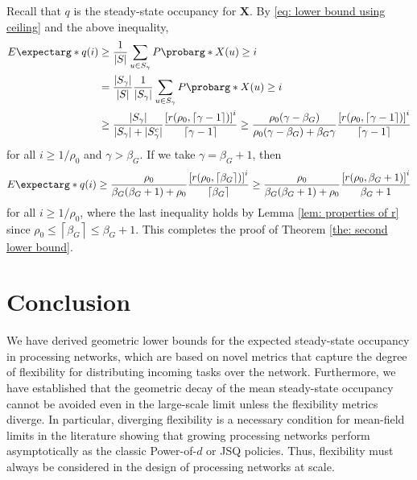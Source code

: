 \documentclass[a4paper, 12pt]{article}
\theoremstyle{definition}
\newcommand{\ceil}[1]{\left\lceil#1\right\rceil}
\newcommand{\bX}{\boldsymbol{X}}
\newcommand{\expect}{E\expectarg}
\newcommand{\cprob}{P\probarg}
\begin{document}
Recall that $q$ is the steady-state occupancy for $\bX$. By \eqref{eq: lower bound using ceiling} and the above inequality,
\begin{align*}
	\expect*{q(i)} &\geq \frac{1}{|S|}\sum_{u \in S_\gamma} \cprob*{X(u) \geq i} \\
	&= \frac{|S_\gamma|}{|S|}\frac{1}{|S_\gamma|}\sum_{u \in S_\gamma} \cprob*{X(u) \geq i} \\
	&\geq \frac{|S_\gamma|}{|S_\gamma| + |S_\gamma^c|}\frac{\left[r(\rho_0, \ceil{\gamma - 1})\right]^i}{\ceil{\gamma - 1}} \geq \frac{\rho_0(\gamma - \beta_G)}{\rho_0(\gamma - \beta_G) + \beta_G\gamma}\frac{\left[r(\rho_0, \ceil{\gamma - 1})\right]^i}{\ceil{\gamma - 1}}
\end{align*}
for all $i \geq 1 / \rho_0$ and $\gamma > \beta_G$. If we take $\gamma = \beta_G + 1$, then
\begin{equation*}
	\expect*{q(i)} \geq \frac{\rho_0}{\beta_G (\beta_G + 1) + \rho_0}\frac{\left[r(\rho_0, \ceil{\beta_G})\right]^i}{\ceil{\beta_G}} \geq \frac{\rho_0}{\beta_G (\beta_G + 1) + \rho_0}\frac{\left[r(\rho_0, \beta_G + 1)\right]^i}{\beta_G + 1}
\end{equation*}
for all $i \geq  1 / \rho_0$, where the last inequality holds by Lemma \ref{lem: properties of r} since $\rho_0 \leq \ceil{\beta_G} \leq \beta_G + 1$. This completes the proof of Theorem \ref{the: second lower bound}.

\section{Conclusion}
\label{sec: conclusion}

We have derived geometric lower bounds for the expected steady-state occupancy in processing networks, which are based on novel metrics that capture the degree of flexibility for distributing incoming tasks over the network. Furthermore, we have established that the geometric decay of the mean steady-state occupancy cannot be avoided even in the large-scale limit unless the flexibility metrics diverge. In particular, diverging flexibility is a necessary condition for mean-field limits in the literature showing that growing processing networks perform asymptotically as the classic Power-of-$d$ or JSQ policies. Thus, flexibility must always be considered in the design of processing networks at scale.

\end{document}
